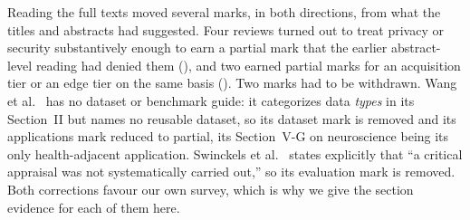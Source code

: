 \documentclass[journal]{IEEEtran}
\begin{document}
Reading the full texts moved several marks, in both directions, from what the
titles and abstracts had suggested. Four reviews turned out to treat privacy or
security substantively enough to earn a partial mark that the earlier
abstract-level reading had denied them
(\cite{Busnatu2022,Sel2025VVUQ,chen2024genaitwin,amin2021edgeintel}), and two
earned partial marks for an acquisition tier or an edge tier on the same basis
(\cite{zhang2022harreview,Zheng2026DTtoWM}). Two marks had to be withdrawn.
Wang et al.~\cite{wang2022deep} has no dataset or benchmark guide: it
categorizes data \emph{types} in its Section~II but names no reusable dataset,
so its dataset mark is removed and its applications mark reduced to partial,
its Section~V-G on neuroscience being its only health-adjacent application.
Swinckels et al.~\cite{swinckels2024ehr} states explicitly that ``a critical
appraisal was not systematically carried out,'' so its evaluation mark is
removed. Both corrections favour our own survey, which is why we give the
section evidence for each of them here.
\end{document}
